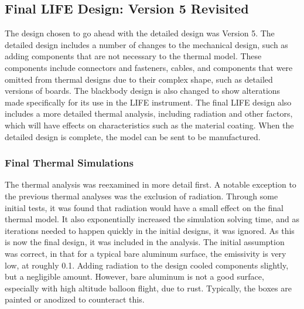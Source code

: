 \subsection{Final LIFE Design: Version 5 Revisited}
The design chosen to go ahead with the detailed design was Version 5. The detailed design includes a number of changes to the mechanical design, such as adding components that are not necessary to the thermal model. These components include connectors and fasteners, cables, and components that were omitted from thermal designs due to their complex shape, such as detailed versions of boards. The blackbody design is also changed to show alterations made specifically for its use in the LIFE instrument. The final LIFE design also includes a more detailed thermal analysis, including radiation and other factors, which will have effects on characteristics such as the material coating. When the detailed design is complete, the model can be sent to be manufactured.

\subsubsection{Final Thermal Simulations}

The thermal analysis was reexamined in more detail first. A notable exception to the previous thermal analyses was the exclusion of radiation. Through some initial tests, it was found that radiation would have a small effect on the final thermal model. It also exponentially increased the simulation solving time, and as iterations needed to happen quickly in the initial designs, it was ignored. As this is now the final design, it was included in the analysis. The initial assumption was correct, in that for a typical bare aluminum surface, the emissivity is very low, at roughly 0.1. Adding radiation to the design cooled components slightly, but a negligible amount. However, bare aluminum is not a good surface, especially with high altitude balloon flight, due to rust. Typically, the boxes are painted or anodized to counteract this.

